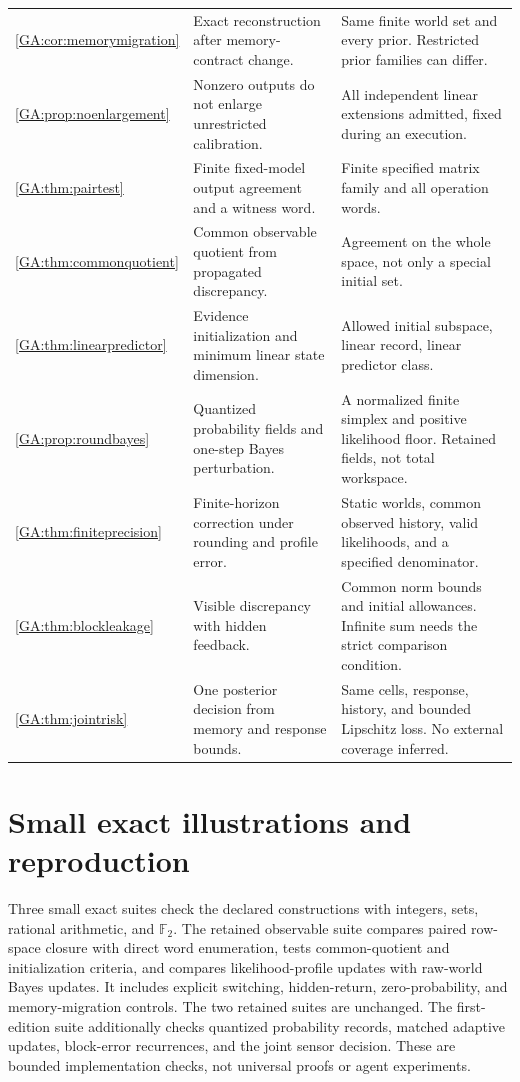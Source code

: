 \documentclass[11pt,oneside,openany]{book}
\numberwithin{equation}{section}
\begin{document}
\begin{small}
\begin{longtable}{@{}P{.13\linewidth}P{.44\linewidth}P{.35\linewidth}@{}}
\ref{GA:cor:memorymigration} & Exact reconstruction after memory-contract change. & Same finite world set and every prior. Restricted prior families can differ.\\
\ref{GA:prop:noenlargement} & Nonzero outputs do not enlarge unrestricted calibration. & All independent linear extensions admitted, fixed during an execution.\\
\ref{GA:thm:pairtest} & Finite fixed-model output agreement and a witness word. & Finite specified matrix family and all operation words.\\
\ref{GA:thm:commonquotient} & Common observable quotient from propagated discrepancy. & Agreement on the whole space, not only a special initial set.\\
\ref{GA:thm:linearpredictor} & Evidence initialization and minimum linear state dimension. & Allowed initial subspace, linear record, linear predictor class.\\
\ref{GA:prop:roundbayes} & Quantized probability fields and one-step Bayes perturbation. & A normalized finite simplex and positive likelihood floor. Retained fields, not total workspace.\\
\ref{GA:thm:finiteprecision} & Finite-horizon correction under rounding and profile error. & Static worlds, common observed history, valid likelihoods, and a specified denominator.\\
\ref{GA:thm:blockleakage} & Visible discrepancy with hidden feedback. & Common norm bounds and initial allowances. Infinite sum needs the strict comparison condition.\\
\ref{GA:thm:jointrisk} & One posterior decision from memory and response bounds. & Same cells, response, history, and bounded Lipschitz loss. No external coverage inferred.\\\bottomrule
\end{longtable}\end{small}


\section{Small exact illustrations and reproduction}\label{GA:app:checks}
Three small exact suites check the declared constructions with integers, sets, rational arithmetic, and $\mathbb F_2$. The retained observable suite compares paired row-space closure with direct word enumeration, tests common-quotient and initialization criteria, and compares likelihood-profile updates with raw-world Bayes updates. It includes explicit switching, hidden-return, zero-probability, and memory-migration controls. The two retained suites are unchanged. The first-edition suite additionally checks quantized probability records, matched adaptive updates, block-error recurrences, and the joint sensor decision. These are bounded implementation checks, not universal proofs or agent experiments.
\end{document}
